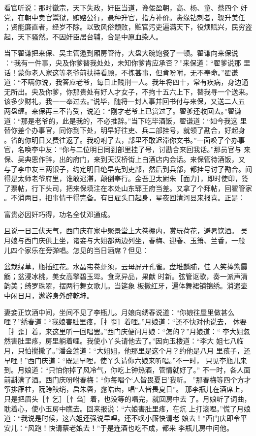 看官听说：那时徽宗，天下失政，奸臣当道，谗佞盈朝，高、杨、童、蔡四个
奸党，在朝中卖官鬻狱，贿赂公行，悬秤升官，指方补价。夤缘钻刺者，骤升美任
；贤能廉直者，经岁不除。以致风俗颓败，赃官污吏遍满天下，役烦赋兴，民穷盗
起，天下骚然。不因奸臣居台辅，合是中原血染人。

当下翟谦把来保、吴主管邀到厢房管待，大盘大碗饱餐了一顿。翟谦向来保说
：“我有一件事，央及你爹替我处处，未知你爹肯应承否？”来保道：“翟爹说那
里话！蒙你老人家这等老爷前扶持看顾，不拣甚事，但肯吩咐，无不奉命。”翟谦
道：“不瞒你说，我答应老爷，每日止贱荆一人。我年将四十，常有疾病，身边通
无所出。央及你爹，你那贵处有好人才女子，不拘十五六上下，替我寻一个送来。
该多少财礼，我一一奉过去。”说毕，随将一封人事并回书付与来保，又送二人五
两盘缠。来保再三不肯受，说道：“刚才老爷上已赏过了。翟爹还收回去。”翟谦
道：“那是老爷的，此是我的，不必推辞。”当下吃毕酒饭，翟谦道：“如今我这
里替你差个办事官，同你到下处，明早好往吏、兵二部挂号，就领了勘合，好起身
。省的你明日又费往返了。我吩咐了去，部里不敢迟滞你文书。”一面唤了个办事
官，名唤李中友：“你与二位明日同到部里挂了号，讨勘合来回我话。”那员官与
来保、吴典恩作辞，出的府门，来到天汉桥街上白酒店内会话。来保管待酒饭，又
与了李中友三两银子，约定明日绝早先到吏部，然后到兵部，都挂号讨了勘合。闻
得是太师老爷府里，谁敢迟滞，颠倒奉行。金吾卫太尉朱［面力］，即时使印，签
了票帖，行下头司，把来保填注在本处山东郓王府当差。又拿了个拜帖，回翟管家
。不消两日，把事情干得完备。有日雇头口起身，星夜回清河县来报喜。正是：

富贵必因奸巧得，功名全仗邓通成。

且说一日三伏天气，西门庆在家中聚景堂上大卷棚内，赏玩荷花，避暑饮酒。
吴月娘与西门庆俱上坐，诸妾与大姐都两边列坐，春梅、迎春、玉箫、兰香，一般
儿四个家乐在旁弹唱。怎见的当日酒席？但见：

盆栽绿草，瓶插红花。水晶帘卷虾须，云母屏开孔雀。盘堆麟脯，佳
人笑捧紫霞觞；盆浸冰桃，美女高擎碧玉斝。食烹异品，果献
时新。弦管讴歌，奏一派声清韵美；绮罗珠翠，摆两行舞女歌儿。当筵象
板撒红牙，遍体舞裙铺锦绣。消遣壶中闲日月，遨游身外醉乾坤。

妻妾正饮酒中间，坐间不见了李瓶儿。月娘向绣春说道：“你娘往屋里做甚么
哩？”绣春道：“我娘害肚里疼，［扌歪］着哩。”月娘道：“还不快对他说去，
休要［扌歪］着，来这里听一回唱罢。”西门庆便问月娘：“怎的？”月娘道：“
李大姐忽然害肚里疼，房里躺着哩。我使小丫头请他去了。”因向玉楼道：“李大
姐七八临月，只怕搅撒了。”潘金莲道：“大姐姐，他那里是这个月？约他是八月
里孩子，还早哩！”西门庆道：“既是早哩，使丫头请你六娘来听唱。”不一时，
只见李瓶儿来到。月娘道：“只怕你掉了风冷气，你吃上钟热酒，管情就好了。”
不一时，各人面前斟满了酒。西门庆吩咐春梅：“你每唱个‘人皆畏夏日’我听。
”那春梅等四个方才筝排雁柱，阮跨鲛绡，启朱唇，露皓齿，唱“人皆畏夏日”。
那李瓶儿在酒席上，只是把眉头［忄乞］［忄刍］着，也没等的唱完，就回房中去
了。月娘听了词曲，耽着心，使小玉房中瞧去。回来报说：“六娘害肚里疼，在炕
上打滚哩。”慌了月娘道：“我说是时候，这六姐还强说早哩。还不唤小厮快请老
娘去！”西门庆即令平安儿：“风跑！快请蔡老娘去！”于是连酒也吃不成，都来
李瓶儿房中问他。

